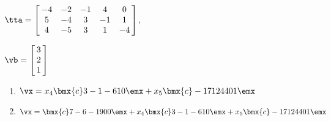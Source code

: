 {$\tta = \left[\hskip -3pt \begin{array}{ccccc} -4&-2&-1&4&0\\  5&-4&3&-1
&1\\  4&-5&3&1&-4\end{array}\hskip -3pt \right] $, 

$\vb=\left[\hskip -3pt \begin{array}{c} 3\\  2\\  1
\end{array}\hskip -3pt \right] $}
{\begin{enumerate}
\item	 $\vx=x_4\bmx{c}3\\ -1 \\-6 \\1\\0\emx + x_5\bmx{c} -17\\ 12 \\ 44 \\0\\1 \emx$

\item	$\vx=\bmx{c} 7\\ -6 \\ -19 \\ 0\\ 0  \emx + x_4\bmx{c}3\\ -1 \\-6 \\1\\0\emx + x_5\bmx{c} -17\\ 12 \\ 44 \\0\\1 \emx$
\end{enumerate}}




